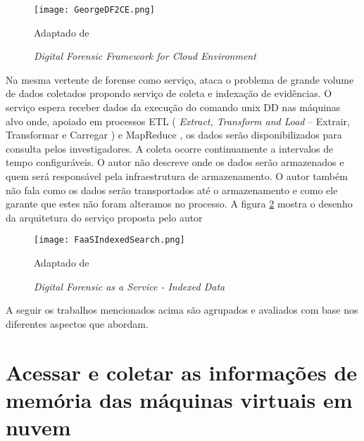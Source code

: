 \begin{figure}[htb!]
\footnotesize
\caption{\textit{Digital Forensic Framework for Cloud Environment}}
\texttt{[image: GeorgeDF2CE.png]}
\centering
\label{fig:GeorgeDF2CE}
\begin{center}
Adaptado de \cite{GeorgeDF2CE:2012} 
\end{center}
\end{figure}

Na mesma vertente de forense como serviço, \cite{FaaSIndexedSearch:2012} ataca o problema de grande volume de dados coletados propondo serviço de coleta e indexação de evidências.
%
O serviço espera receber dados da execução do comando unix DD \cite{UnixManPagesDD} nas máquinas alvo onde, apoiado em processos ETL ( \textit{Extract, Transform and Load} -- Extrair, Transformar e Carregar ) e MapReduce \cite{WikipediaMapReduce}, os dados serão disponibilizados para consulta pelos investigadores.
%
A coleta ocorre continuamente a intervalos de tempo configuráveis.
%
O autor não descreve onde os dados serão armazenados e quem será responsável pela infraestrutura de armazenamento.
%
O autor também não fala como os dados serão transportados até o armazenamento e como ele garante que estes não foram alteramos no processo.
%
A figura \ref{fig:FaaSIndexedSearch} mostra o desenho da arquitetura do serviço proposta pelo autor

\begin{figure}[htb!]
\footnotesize
\caption{\textit{Digital Forensic as a Service - Indexed Data}}
\texttt{[image: FaaSIndexedSearch.png]}
\centering
\label{fig:FaaSIndexedSearch}
\begin{center}
Adaptado de \cite{FaaSIndexedSearch:2012} 
\end{center}
\end{figure}

A seguir os trabalhos mencionados acima são agrupados e avaliados com base nos diferentes aspectos que abordam.

\section{Acessar e coletar as informações de memória das máquinas virtuais em nuvem}
\label{sec:coletadeevidencia}

